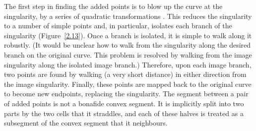 The first step in finding the added points is to blow up the curve at the 
singularity, by a series of quadratic transformations \cite{walker}.
This reduces the singularity to a number of simple points and, in particular,
isolates each branch of the singularity (Figure~\ref{2.13}).
Once a branch is isolated, it is simple to 
walk \cite{bhhl} along it robustly.
(It would be unclear how to walk from the singularity along the desired branch
on the original curve. This problem is resolved by walking from the image
singularity along the isolated image branch.)
Therefore, upon each image branch, two points are found by walking (a very 
short distance) in either direction from the image singularity.
Finally, these points are mapped back to the original curve
to become new endpoints, replacing the singularity.
The segment between a pair of added points is not a bonafide convex segment.
It is implicitly split into two parts by the two cells that it straddles,
and each of these halves is treated as 
a subsegment of the convex segment that it neighbours.




